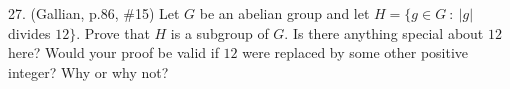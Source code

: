\documentclass[12pt]{article}
\begin{document}
\begin{description}
\msk

\item{27.} (Gallian, p.86, \#15) Let $G$ be an abelian group and let 
$H = \{g \in G\ :\ |g|$ divides $12\}$.
Prove that $H$ is a subgroup of $G$. Is there anything special about $12$
here? Would your proof be valid if $12$ were replaced by some other
positive integer? Why or why not?


\end{description}
\vfill
\end{document}
